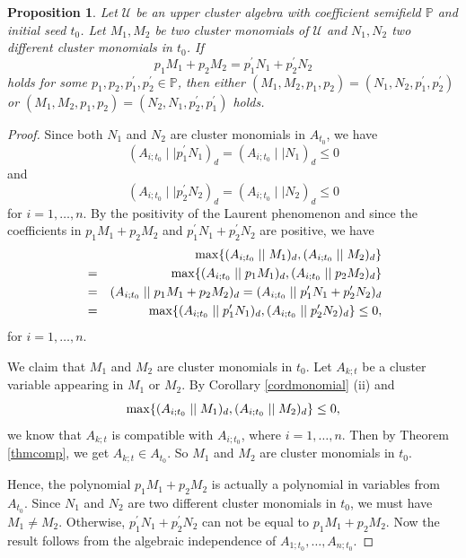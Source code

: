 \documentclass{amsart}
\newtheorem{proposition}[theorem]{Proposition}
\theoremstyle{definition}
\theoremstyle{remark}
\numberwithin{equation}{section}
\begin{document}
\begin{proposition}\label{protwo}
Let $\mathcal U$ be an upper  cluster algebra with coefficient semifield $\mathbb P$ and  initial seed $t_0$.
Let $M_1, M_2$ be two cluster monomials of $\mathcal U$ and $N_1, N_2$  two different cluster monomials in $t_0$. If $$p_1M_1+p_2M_2=p_1^\prime N_1+p_2^\prime N_2$$ holds for some $p_1,p_2,p_1^\prime,p_2^\prime\in\mathbb{P}$, then either
$(M_1, M_2, p_1, p_2)=(N_1, N_2, p_1^\prime, p_2^\prime)$
or
$(M_1, M_2, p_1, p_2)=(N_2, N_1, p_2^\prime, p_1^\prime)$ holds.
\end{proposition}
\begin{proof}
Since both $N_1$ and $N_2$ are cluster monomials in $A_{t_0}$, we have
 $$(A_{i;t_0}\mid\mid p_1^\prime N_1)_d=(A_{i;t_0}\mid\mid N_1)_d\leq 0$$
 and
  $$(A_{i;t_0}\mid\mid  p_2^\prime N_2)_d=(A_{i;t_0}\mid\mid  N_2)_d\leq 0$$
for $i=1,\ldots,n$.
By the positivity of the Laurent phenomenon and since the coefficients in $p_1M_1+p_2M_2$ and $p_1^\prime N_1+p_2^\prime N_2$ are positive, we have
\begin{eqnarray}
&&{\rm max}\{(A_{i;t_0}\mid\mid   M_1)_d,(A_{i;t_0}\mid\mid  M_2)_d\}\nonumber\\
&=&{\rm max}\{(A_{i;t_0}\mid\mid  p_1 M_1)_d,(A_{i;t_0}\mid\mid  p_2M_2)_d\}\nonumber\\
&=&(A_{i;t_0}\mid\mid   p_1M_1+p_2M_2)_d=(A_{i;t_0}\mid\mid   p_1^\prime N_1+p_2^\prime N_2)_d\nonumber\\
&=&{\rm max}\{(A_{i;t_0}\mid\mid  p_1^\prime N_1)_d,(A_{i;t_0}\mid\mid  p_2^\prime N_2)_d\}\leq 0,\nonumber
\end{eqnarray}
for  $i=1,\ldots,n$.

We claim that $M_1$ and $M_2$ are cluster monomials in $t_0$. Let $A_{k;t}$ be a cluster variable appearing in $M_1$ or $M_2$. By Corollary \ref{cordmonomial} (ii) and $${\rm max}\{(A_{i;t_0}\mid\mid   M_1)_d,(A_{i;t_0}\mid\mid  M_2)_d\}\leq0,$$ we know that
$A_{k;t}$ is compatible with $A_{i;t_0}$, where $i=1,\ldots,n$. Then by Theorem \ref{thmcomp}, we  get $A_{k;t}\in A_{t_0}$. So $M_1$ and $M_2$ are cluster monomials in $t_0$.

 Hence,  the polynomial  $p_1M_1+p_2M_2$ is actually a polynomial in variables from $A_{t_0}$.  Since $N_1$ and $N_2$ are two different cluster monomials in $t_0$, we must have $M_1\neq M_2$. Otherwise, $p_1^\prime N_1+p_2^\prime N_2$ can not be equal to $p_1M_1+p_2M_2$. Now the result follows from  the algebraic independence of $A_{1;t_0},\ldots,A_{n;t_0}$.
\end{proof}
\end{document}
